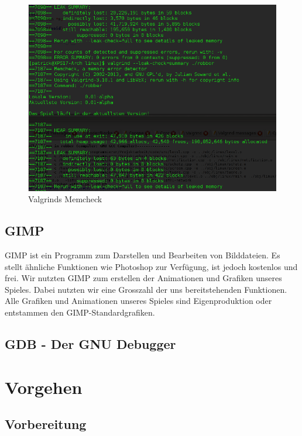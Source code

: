 \documentclass[11pt,a4paper]{scrbook}
\begin{document}
\begin{figure}
\centering
\includegraphics[scale=0.5]{img/valgrind2.png}
\caption{Valgrinds Memcheck}
\end{figure}


\section{GIMP}
GIMP ist ein Programm zum Darstellen und Bearbeiten von Bilddateien.
Es stellt ähnliche Funktionen wie Photoshop zur Verfügung, ist jedoch kostenlos und frei.
Wir nutzten GIMP zum erstellen der Animationen und Grafiken unseres Spieles.
Dabei nutzten wir eine Grosszahl der uns bereitstehenden Funktionen.
Alle Grafiken und Animationen unseres Spieles sind Eigenproduktion oder entstammen den GIMP-Standardgrafiken.
\section{GDB - Der GNU Debugger}


\chapter{Vorgehen}
\section{Vorbereitung}
\end{document}
